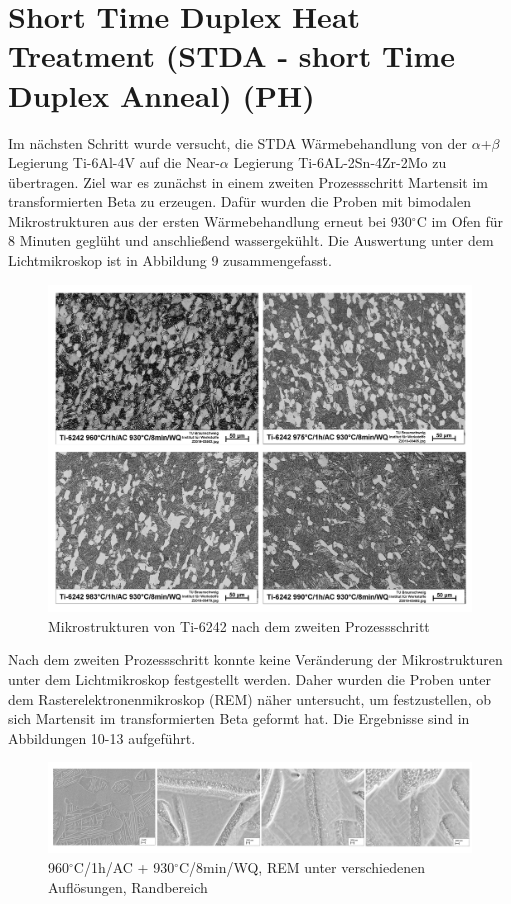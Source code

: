 \pagebreak

\section{Short Time Duplex Heat Treatment (STDA - short Time Duplex Anneal) (PH)}

Im nächsten Schritt wurde versucht, die STDA Wärmebehandlung von der $\alpha$+$\beta$ Legierung Ti-6Al-4V auf die Near-$\alpha$ Legierung Ti-6AL-2Sn-4Zr-2Mo zu übertragen. Ziel war es zunächst in einem zweiten Prozessschritt Martensit im transformierten Beta zu erzeugen. Dafür wurden die Proben mit bimodalen Mikrostrukturen aus der ersten Wärmebehandlung erneut bei 930$^\circ$C im Ofen für 8 Minuten geglüht und anschließend wassergekühlt. Die Auswertung unter dem Lichtmikroskop ist in Abbildung 9 zusammengefasst.

\begin{figure}[h]
	\centering
	\includegraphics[width=0.9\linewidth]{"Bilder/Abbildung 9"}
	\caption[Abbildung 9]{Mikrostrukturen von Ti-6242 nach dem zweiten Prozessschritt}
	\label{fig:abbildung-9}
\end{figure}

Nach dem zweiten Prozessschritt konnte keine Veränderung der Mikrostrukturen unter dem Lichtmikroskop festgestellt werden. Daher wurden die Proben unter dem Rasterelektronenmikroskop (REM) näher untersucht, um festzustellen, ob sich Martensit im transformierten Beta geformt hat. Die Ergebnisse sind in Abbildungen 10-13 aufgeführt.

\pagebreak

\begin{figure}[!]
	\centering
	\includegraphics[width=0.9\linewidth]{"Bilder/Abbildung 10"}
	\caption[Abbildung 10]{960$^\circ$C/1h/AC + 930$^\circ$C/8min/WQ, REM unter verschiedenen Auflösungen, Randbereich}
	\label{fig:abbildung-10}
\end{figure}

